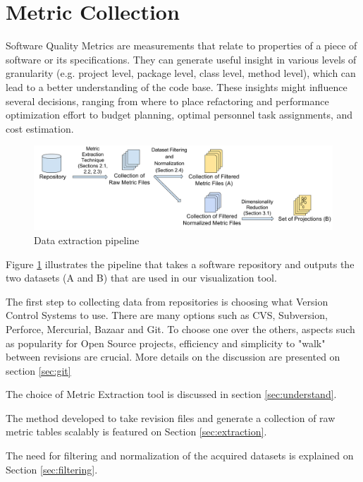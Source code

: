 \section{Metric Collection} \label{sec:metrics}

Software Quality Metrics are measurements that relate to properties of a piece of software or its specifications. They can generate useful insight in various levels of granularity (e.g. project level, package level, class level, method level), which can lead to a better understanding of the code base. These insights might influence several decisions, ranging from where to place refactoring and performance optimization effort to budget planning, optimal personnel task assignments, and cost estimation.

\begin{figure}[H]
  \centering
  \includegraphics[width=\textwidth]{figures/pipeline.png}
  \caption{Data extraction pipeline}
  \label{fig:data_pipeline}
\end{figure}

Figure \ref{fig:data_pipeline} illustrates the pipeline that takes a software repository and outputs the two datasets (A and B) that are used in our visualization tool.

The first step to collecting data from repositories is choosing what Version Control Systems to use. There are many options such as CVS, Subversion, Perforce, Mercurial, Bazaar and Git. To choose one over the others, aspects such as popularity for Open Source projects, efficiency and simplicity to "walk" between revisions are crucial. More details on the discussion are presented on section \ref{sec:git}

The choice of Metric Extraction tool is discussed in section \ref{sec:understand}.

The method developed to take revision files and generate a collection of raw metric tables scalably is featured on Section \ref{sec:extraction}.

The need for filtering and normalization of the acquired datasets is explained on Section \ref{sec:filtering}.

